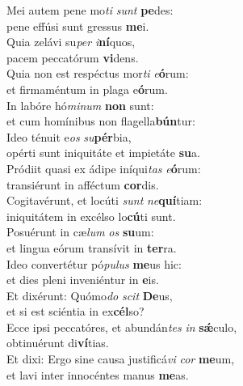 \evenverse Mei autem pene mo\textit{ti} \textit{sunt} \textbf{pe}des:~\*\\
\evenverse pene effúsi sunt gressus \textbf{me}i.\\
\oddverse Quia zelávi su\textit{per} \textit{i}\textbf{ní}quos,~\*\\
\oddverse pacem peccatórum \textbf{vi}dens.\\
\evenverse Quia non est respéctus mor\textit{ti} \textit{e}\textbf{ó}rum:~\*\\
\evenverse et firmaméntum in plaga e\textbf{ó}rum.\\
\oddverse In labóre hó\textit{mi}\textit{num} \textbf{non} sunt:~\*\\
\oddverse et cum homínibus non flagella\textbf{bún}tur:\\
\evenverse Ideo ténuit e\textit{os} \textit{su}\textbf{pér}bia,~\*\\
\evenverse opérti sunt iniquitáte et impietáte \textbf{su}a.\\
\oddverse Pródiit quasi ex ádipe iníqui\textit{tas} \textit{e}\textbf{ó}rum:~\*\\
\oddverse transiérunt in afféctum \textbf{cor}dis.\\
\evenverse Cogitavérunt, et locúti \textit{sunt} \textit{ne}\textbf{quí}tiam:~\*\\
\evenverse iniquitátem in excélso lo\textbf{cú}ti sunt.\\
\oddverse Posuérunt in cæ\textit{lum} \textit{os} \textbf{su}um:~\*\\
\oddverse et lingua eórum transívit in \textbf{ter}ra.\\
\evenverse Ideo convertétur pó\textit{pu}\textit{lus} \textbf{me}us hic:~\*\\
\evenverse et dies pleni inveniéntur in \textbf{e}is.\\
\oddverse Et dixérunt: Quómo\textit{do} \textit{scit} \textbf{De}us,~\*\\
\oddverse et si est sciéntia in ex\textbf{cél}so?\\
\evenverse Ecce ipsi peccatóres, et abundán\textit{tes} \textit{in} \textbf{sǽ}culo,~\*\\
\evenverse obtinuérunt di\textbf{ví}tias.\\
\oddverse Et dixi: Ergo sine causa justificá\textit{vi} \textit{cor} \textbf{me}um,~\*\\
\oddverse et lavi inter innocéntes manus \textbf{me}as.\\
